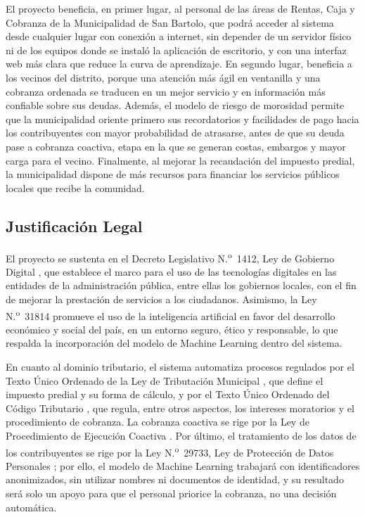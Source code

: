 \documentclass[12pt,a4paper]{report}
\begin{document}
El proyecto beneficia, en primer lugar, al personal de las áreas de Rentas, Caja y Cobranza de la Municipalidad de San Bartolo, que podrá acceder al sistema desde cualquier lugar con conexión a internet, sin depender de un servidor físico ni de los equipos donde se instaló la aplicación de escritorio, y con una interfaz web más clara que reduce la curva de aprendizaje. En segundo lugar, beneficia a los vecinos del distrito, porque una atención más ágil en ventanilla y una cobranza ordenada se traducen en un mejor servicio y en información más confiable sobre sus deudas. Además, el modelo de riesgo de morosidad permite que la municipalidad oriente primero sus recordatorios y facilidades de pago hacia los contribuyentes con mayor probabilidad de atrasarse, antes de que su deuda pase a cobranza coactiva, etapa en la que se generan costas, embargos y mayor carga para el vecino. Finalmente, al mejorar la recaudación del impuesto predial, la municipalidad dispone de más recursos para financiar los servicios públicos locales que recibe la comunidad.

\subsection{Justificación Legal}

El proyecto se sustenta en el Decreto Legislativo N.\textsuperscript{o}~1412, Ley de Gobierno Digital \parencite{dleg1412}, que establece el marco para el uso de las tecnologías digitales en las entidades de la administración pública, entre ellas los gobiernos locales, con el fin de mejorar la prestación de servicios a los ciudadanos. Asimismo, la Ley N.\textsuperscript{o}~31814 \parencite{ley31814} promueve el uso de la inteligencia artificial en favor del desarrollo económico y social del país, en un entorno seguro, ético y responsable, lo que respalda la incorporación del modelo de Machine Learning dentro del sistema.

En cuanto al dominio tributario, el sistema automatiza procesos regulados por el Texto Único Ordenado de la Ley de Tributación Municipal \parencite{tuoltm}, que define el impuesto predial y su forma de cálculo, y por el Texto Único Ordenado del Código Tributario \parencite{codigotributario}, que regula, entre otros aspectos, los intereses moratorios y el procedimiento de cobranza. La cobranza coactiva se rige por la Ley de Procedimiento de Ejecución Coactiva \parencite{ley26979}. Por último, el tratamiento de los datos de los contribuyentes se rige por la Ley N.\textsuperscript{o}~29733, Ley de Protección de Datos Personales \parencite{ley29733}; por ello, el modelo de Machine Learning trabajará con identificadores anonimizados, sin utilizar nombres ni documentos de identidad, y su resultado será solo un apoyo para que el personal priorice la cobranza, no una decisión automática.
\end{document}
